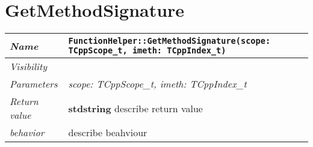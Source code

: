  \section{GetMethodSignature}
\begin{longtable}{p{3cm} @{\hskip 1cm} p{12cm}}
 \hline
\textit{Name} & \texttt{FunctionHelper::GetMethodSignature(scope: TCppScope_t, imeth: TCppIndex_t)}\\
\hline
 \textit{Visibility} & \\
\hline
\textit{Parameters} & \textit{scope: TCppScope_t, imeth: TCppIndex_t}\\
\hline
\textit{Return value} & \textbf{ stdstring} describe return value\\
  \hline
 \textit{behavior} & describe beahviour \\
\hline
\end{longtable} \pagebreak
